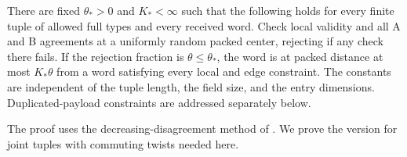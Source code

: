 \begin{lemma}\label{oc:full-proximity}
There are fixed $\theta_*>0$ and $K_*<\infty$ such that the following
holds for every finite tuple of allowed full types and every received
word.  Check local validity and all A and B agreements at a uniformly
random packed center, rejecting if any check there fails.  If the
rejection fraction is $\theta\le\theta_*$, the word is at packed
distance at most $K_*\theta$ from a word satisfying every local and
edge constraint.  The constants are independent of the tuple length,
the field size, and the entry dimensions.  Duplicated-payload
constraints are addressed separately below.
\end{lemma}

The proof uses the decreasing-disagreement method of
\cite[Section~4.2, Algorithm~1 and Propositions~4.7--4.8]{DEL+2022}.
We prove the version for joint tuples with commuting twists needed here.

